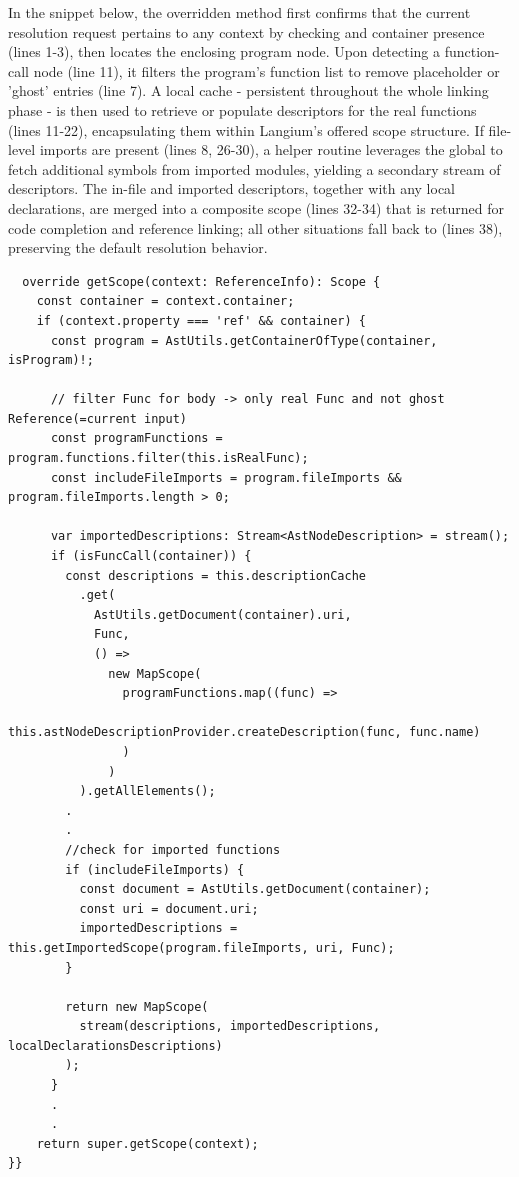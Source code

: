 In the snippet below, the overridden  method first confirms that the current resolution request pertains to any  context by checking
 and container presence (lines 1-3), then locates the enclosing program node. Upon detecting a function-call node (line 11), it filters the program's
function list to remove placeholder or 'ghost' entries (line 7). A local cache - persistent throughout the whole linking phase - is
then used to retrieve or populate descriptors for the real functions (lines 11-22), encapsulating them within Langium's offered scope structure. If file-level imports are present
(lines 8, 26-30), a helper routine leverages the global  to fetch additional symbols from imported modules, yielding a secondary stream of descriptors.
The in-file and imported descriptors, together with any local declarations, are merged into a composite scope (lines 32-34) that is returned for code completion and reference
linking; all other situations fall back to  (lines 38), preserving the default resolution behavior.

\begin{verbatim}
  override getScope(context: ReferenceInfo): Scope {
    const container = context.container;
    if (context.property === 'ref' && container) {
      const program = AstUtils.getContainerOfType(container, isProgram)!;

      // filter Func for body -> only real Func and not ghost Reference(=current input)
      const programFunctions = program.functions.filter(this.isRealFunc);
      const includeFileImports = program.fileImports && program.fileImports.length > 0;

      var importedDescriptions: Stream<AstNodeDescription> = stream();
      if (isFuncCall(container)) {
        const descriptions = this.descriptionCache
          .get(
            AstUtils.getDocument(container).uri,
            Func,
            () =>
              new MapScope(
                programFunctions.map((func) =>
                  this.astNodeDescriptionProvider.createDescription(func, func.name)
                )
              )
          ).getAllElements();
        .
        .      
        //check for imported functions
        if (includeFileImports) {
          const document = AstUtils.getDocument(container);
          const uri = document.uri;
          importedDescriptions = this.getImportedScope(program.fileImports, uri, Func);
        }

        return new MapScope(
          stream(descriptions, importedDescriptions, localDeclarationsDescriptions)
        );
      } 
      .
      .
    return super.getScope(context);
}}
\end{verbatim}
\vspace{0.5em}

